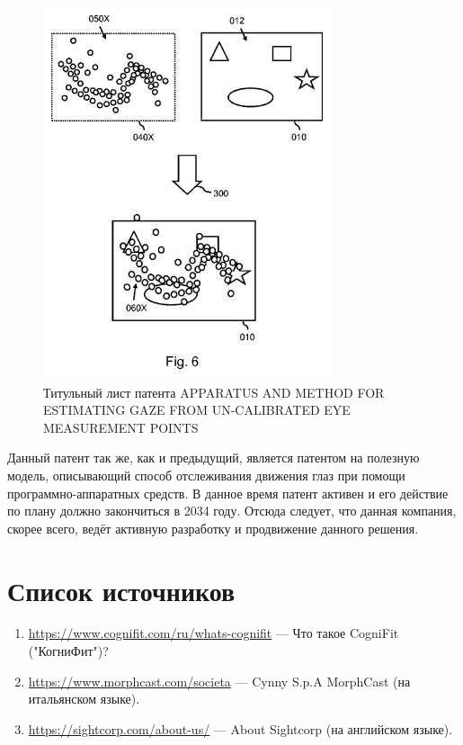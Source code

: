 \documentclass[12pt]{article}
\begin{document}
    \begin{figure}[ht]
        \centering
        \includegraphics[scale=0.8]{images/6.png}
        \caption{Титульный лист патента APPARATUS AND METHOD FOR ESTIMATING GAZE FROM UN-CALIBRATED EYE MEASUREMENT POINTS}
        \label{fig:o:6}
    \end{figure}

    Данный патент так же, как и предыдущий, является патентом на полезную модель, описывающий способ отслеживания движения глаз при помощи программно-аппаратных средств.
    В данное время патент активен и его действие по плану должно закончиться в 2034 году. Отсюда следует, что данная компания, скорее всего, ведёт активную разработку и продвижение данного решения.

    \newpage

    \section{Список источников}

    \begin{enumerate}
        \item \href{https://www.cognifit.com/ru/whats-cognifit}{https://www.cognifit.com/ru/whats-cognifit} --- Что такое CogniFit ("КогниФит")?
        \item \href{https://www.morphcast.com/societa}{https://www.morphcast.com/societa} --- Cynny S.p.A MorphCast (на итальянском языке).
        \item \href{https://sightcorp.com/about-us/}{https://sightcorp.com/about-us/} --- About Sightcorp (на английском языке).
    \end{enumerate}
\end{document}
